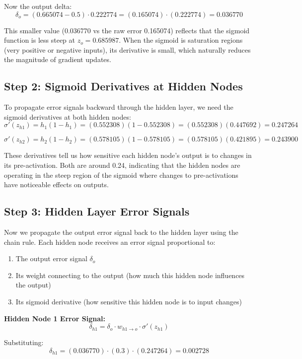 \documentclass[12pt]{article}
\begin{document}
Now the output delta:
\[
\delta_o = (0.665074 - 0.5) \cdot 0.222774 = (0.165074) \cdot (0.222774) = 0.036770
\]

This smaller value (0.036770 vs the raw error 0.165074) reflects that the sigmoid function is less steep at $z_o = 0.685987$. When the sigmoid is saturation regions (very positive or negative inputs), its derivative is small, which naturally reduces the magnitude of gradient updates.

\subsection*{Step 2: Sigmoid Derivatives at Hidden Nodes}

To propagate error signals backward through the hidden layer, we need the sigmoid derivatives at both hidden nodes:
\[
\sigma'(z_{h1}) = h_1(1 - h_1) = (0.552308)(1 - 0.552308) = (0.552308)(0.447692) = 0.247264
\]

\[
\sigma'(z_{h2}) = h_2(1 - h_2) = (0.578105)(1 - 0.578105) = (0.578105)(0.421895) = 0.243900
\]

These derivatives tell us how sensitive each hidden node's output is to changes in its pre-activation. Both are around 0.24, indicating that the hidden nodes are operating in the steep region of the sigmoid where changes to pre-activations have noticeable effects on outputs.

\subsection*{Step 3: Hidden Layer Error Signals}

Now we propagate the output error signal back to the hidden layer using the chain rule. Each hidden node receives an error signal proportional to:
\begin{enumerate}
    \item The output error signal $\delta_o$
    \item Its weight connecting to the output (how much this hidden node influences the output)
    \item Its sigmoid derivative (how sensitive this hidden node is to input changes)
\end{enumerate}

\noindent\textbf{Hidden Node 1 Error Signal:}
\[
\delta_{h1} = \delta_o \cdot w_{h1 \to o} \cdot \sigma'(z_{h1})
\]

Substituting:
\[
\delta_{h1} = (0.036770) \cdot (0.3) \cdot (0.247264) = 0.002728
\]
\end{document}
